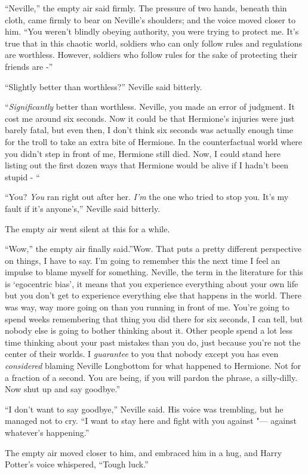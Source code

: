 ``Neville,'' the empty air said firmly. The pressure of two hands,
beneath thin cloth, came firmly to bear on Neville's shoulders; and the
voice moved closer to him. ``You weren't blindly obeying authority, you
were trying to protect me. It's true that in this chaotic world,
soldiers who can only follow rules and regulations are worthless.
However, soldiers who follow rules for the sake of protecting their
friends are -''

``Slightly better than worthless?'' Neville said bitterly.

``\emph{Significantly} better than worthless. Neville, you made an error
of judgment. It cost me around six seconds. Now it could be that
Hermione's injuries were just barely fatal, but even then, I don't think
six seconds was actually enough time for the troll to take an extra bite
of Hermione. In the counterfactual world where you didn't step in front
of me, Hermione still died. Now, I could stand here listing out the
first dozen ways that Hermione would be alive if I hadn't been stupid -
``

``You? \emph{You} ran right out after her. \emph{I'm} the one who tried
to stop you. It's my fault if it's anyone's,'' Neville said bitterly.

The empty air went silent at this for a while.

``Wow,'' the empty air finally said.''Wow. That puts a pretty different
perspective on things, I have to say. I'm going to remember this the
next time I feel an impulse to blame myself for something. Neville, the
term in the literature for this is `egocentric bias', it means that you
experience everything about your own life but you don't get to
experience everything else that happens in the world. There was way, way
more going on than you running in front of me. You're going to spend
weeks remembering that thing you did there for six seconds, I can tell,
but nobody else is going to bother thinking about it. Other people spend
a lot less time thinking about your past mistakes than you do, just
because you're not the center of their worlds. I \emph{guarantee} to you
that nobody except you has even \emph{considered} blaming Neville
Longbottom for what happened to Hermione. Not for a fraction of a
second. You are being, if you will pardon the phrase, a silly-dilly. Now
shut up and say goodbye.''

``I don't want to say goodbye,'' Neville said. His voice was trembling,
but he managed not to cry. ``I want to stay here and fight with you
against "--- against whatever's happening.''

The empty air moved closer to him, and embraced him in a hug, and Harry
Potter's voice whispered, ``Tough luck.''
